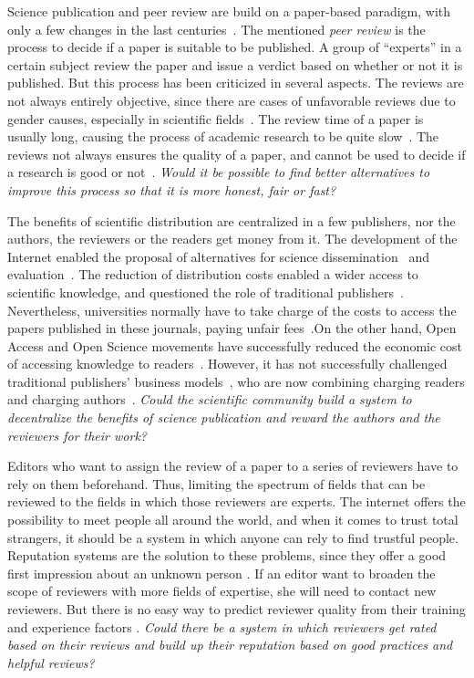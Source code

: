 Science publication and peer review are build on a paper-based paradigm, with
only a few changes in the last centuries~\cite{spier2002history}. The mentioned
\emph{peer review} is the process to decide if a paper is suitable to be
published. A group of ``experts'' in a certain subject review the paper and
issue a verdict based on whether or not it is published. But this process has
been criticized in several aspects. The reviews are not always entirely
objective, since there are cases of unfavorable reviews due to gender causes,
especially in scientific fields~\cite{wenneras2001nepotism}. The review time of
a paper is usually long, causing the process of academic research to be quite
slow~\cite{huisman2017duration}. The reviews not always ensures the quality of a
paper, and cannot be used to decide if a research is good or
not~\cite{goldbeck1999evidence}. \emph{Would it be possible to find better
  alternatives to improve this process so that it is more honest, fair or fast?}

The benefits of scientific distribution are centralized in a few publishers, nor
the authors, the reviewers or the readers get money from it. The development of
the Internet enabled the proposal of alternatives for science
dissemination~\cite{eysenbach2006citation} and
evaluation~\cite{walker_emerging_2015}. The reduction of distribution costs
enabled a wider access to scientific knowledge, and questioned the role of
traditional publishers~\cite{ReinventingRigor}. Nevertheless, universities
normally have to take charge of the costs to access the papers published in
these journals, paying unfair fees~\cite{bergstrom2004costs}.On the other hand,
Open Access and Open Science movements have successfully reduced the economic
cost of accessing knowledge to readers~\cite{evans2009open}. However, it has not
successfully challenged traditional publishers' business
models~\cite{lariviere2015oligopoly}, who are now combining charging readers and
charging authors~\cite{van2013true}. \emph{Could the scientific community build
  a system to decentralize the benefits of science publication and reward the
  authors and the reviewers for their work?}

Editors who want to assign the review of a paper to a series of reviewers have
to rely on them beforehand. Thus, limiting the spectrum of fields that can be
reviewed to the fields in which those reviewers are experts. The internet offers
the possibility to meet people all around the world, and when it comes to trust
total strangers, it should be a system in which anyone can rely to find trustful
people. Reputation systems are the solution to these problems, since they offer
a good first impression about an unknown person \cite{resnick2000reputation}. If
an editor want to broaden the scope of reviewers with more fields of expertise,
she will need to contact new reviewers. But there is no easy way to predict
reviewer quality from their training and experience factors
\cite{callaham_relationship_2007}. \emph{Could there be a system in which
  reviewers get rated based on their reviews and build up their reputation based
  on good practices and helpful reviews?}

